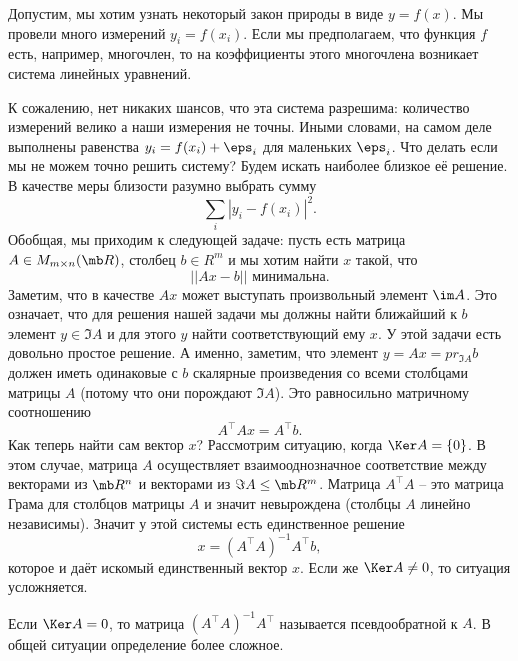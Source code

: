 Допустим, мы хотим узнать некоторый закон природы в виде $y=f(x)$. Мы провели много измерений $y_i=f(x_i)$. Если мы предполагаем, что функция $f$ есть, например, многочлен, то на коэффициенты этого многочлена возникает система линейных уравнений. 

К сожалению, нет никаких шансов, что эта система разрешима: количество измерений велико а наши измерения не точны. Иными словами, на самом деле выполнены равенства $y_i= f(x_i) + \eps_i$ для маленьких $\eps_i$. Что делать если мы не можем точно решить систему? Будем искать наиболее близкое её решение. В качестве меры близости разумно выбрать сумму
$$\sum_i |y_i-f(x_i)|^2.$$
Обобщая, мы приходим к следующей задаче: пусть есть матрица $A\in M_{m\times n}(\mb R)$, столбец $b\in R^m$ и мы хотим найти $x$ такой, что  
$$||Ax-b|| \text{ минимальна.}$$
Заметим, что в качестве $Ax$ может выступать произвольный элемент $\im A$. Это означает, что для решения нашей задачи мы должны найти ближайший к $b$ элемент $y \in \Im A$ и для этого $y$ найти соответствующий ему $x$. У этой задачи есть довольно простое решение. А именно, заметим, что элемент $y=Ax=pr_{\Im A} b$ должен иметь одинаковые с $b$ скалярные произведения со всеми столбцами матрицы $A$ (потому что они порождают $\Im A$). Это равносильно матричному соотношению
$$A^\top A x=A^\top b.$$
Как теперь найти сам вектор $x$? Рассмотрим ситуацию, когда $\Ker A=\{0\}$. В этом случае, матрица $A$ осуществляет взаимооднозначное соответствие между векторами из $\mb R^n$ и векторами из $\Im A \leq \mb R^m$.
Матрица $A^\top A$ -- это матрица Грама для столбцов матрицы $A$ и значит невырождена (столбцы $A$ линейно независимы). Значит у этой системы есть единственное решение 
$$x=(A^\top A)^{-1}A^\top b,$$
которое и даёт искомый единственный вектор $x$. Если же $\Ker A \neq 0$, то ситуация усложняется. 

\begin{comment}

Мы по прежнему ищем $y\in \Im A$ ближайший к $b$. Но для данного $y$ есть много $x\in \mb R^n$, что $Ax=y$. Какой из них выбрать? Выберем $x$ с наименьшей  длиной. Что это означает? Представим произвольное решение этого уравнения как $x_0+z$, где $z\in \Ker A$. Наименьшее длина такого вектора будет достигаться при $z= pr_{\Ker A} x_0$. В этом случае $x=x_0+z$ будет равен проекции $x_0$ на $(\Ker A)^{\bot}$. Способ нахождения такого элемента мы обсудим позже.

\end{comment}

\dfn Если $\Ker A =0$, то матрица $(A^{\top }A)^{-1}A^{\top}$ называется псевдообратной к $A$. В общей ситуации определение более сложное.
\edfn

